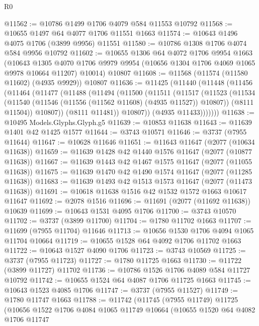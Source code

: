 \begin{lexlean}{R0}
\begin{coremodule}
@11562 := @10786 @1499 @1706 @4079 @584 @11553 @10792
@11568 := @10655 @1497 @64 @4077 @1706 @11551 @1663
@11574 := @10643 @1496 @4075 @1706 (@3899 @9956) @11551
@11580 := @10786 @1308 @1706 @4074 @584 @9956 @10792
@11602 := @10655
    @1306
    @64
    @4072
    @1706
    @9954
    @1663
    (@10643
      @1305
      @4070
      @1706
      @9979
      @9954
      (@10656 @1304 @1706 @4069 @1065 @9978 @10664 @11207)
      @10014)
    @10807
@11608 := @11568 (@11574 (@11580 @11602) (@4935 @9929)) @10807
@11636 := @11425
    (@11440
      (@11448
        (@11456
          (@11464
            (@11477
              (@11488
                (@11494
                  (@11500
                    (@11511
                      (@11517
                        (@11523
                          (@11534
                            (@11540 (@11546 (@11556 (@11562 @11608) (@4935 @11527)) @10807))
                            (@8111 @11504))
                          @10807))
                      (@8111 @11481))
                    @10807))
                (@4935 @11433)))))))
@11638 := @10495 Models.Glyphs.Glyph.g5
@11639 := @10853 @11638
@11643 := @11639 @1401 @42 @1425 @1577
@11644 := @3743 @10571
@11646 := @3737 (@7955 @11644)
@11647 := @10628 @11646
@11651 := @11643 @11647 (@2077 (@10634 @11638))
@11659 := @11639 @1428 @42 @1440 @1576 @11647 (@2077 (@10877 @11638))
@11667 := @11639 @1443 @42 @1467 @1575 @11647 (@2077 (@11055 @11638))
@11675 := @11639 @1470 @42 @1490 @1574 @11647 (@2077 (@11285 @11638))
@11683 := @11639 @1493 @42 @1513 @1573 @11647 (@2077 (@11473 @11638))
@11691 := @10618 @11638 @1516 @42 @1532 @1572 @1663 @10617 @11647
@11692 := @2078 @1516
@11696 := @11691 (@2077 (@11692 @11638)) @10639
@11699 := @10643 @1531 @4095 @1706
@11700 := @3743 @10570
@11702 := @3737 (@3899 @11700)
@11704 := @1780 @11702 @1663
@11707 := @11699 (@7955 @11704) @11646
@11713 := @10656 @1530 @1706 @4094 @1065 @11704 @10664
@11719 := @10655 @1528 @64 @4092 @1706 @11702 @1663
@11722 := @10643 @1527 @4090 @1706
@11723 := @3743 @10569
@11725 := @3737 (@7955 @11723)
@11727 := @1780 @11725 @1663
@11730 := @11722 (@3899 @11727) @11702
@11736 := @10786 @1526 @1706 @4089 @584 @11727 @10792
@11742 := @10655 @1524 @64 @4087 @1706 @11725 @1663
@11745 := @10643 @1523 @4085 @1706
@11747 := @3737 (@7955 @11527)
@11749 := @1780 @11747 @1663
@11788 := @11742
    (@11745
      (@7955 @11749)
      @11725
      (@10656
        @1522
        @1706
        @4084
        @1065
        @11749
        @10664
        (@10655
          @1520
          @64
          @4082
          @1706
          @11747

\end{coremodule}
\end{lexlean}
